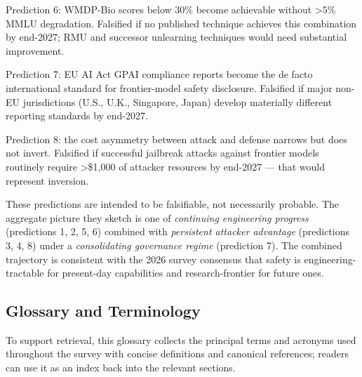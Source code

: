 Prediction 6: WMDP-Bio scores below 30\% become achievable without \textgreater5\% MMLU degradation. Falsified if no published technique achieves this combination by end-2027; RMU and successor unlearning techniques would need substantial improvement.

Prediction 7: EU AI Act GPAI compliance reports become the de facto international standard for frontier-model safety disclosure. Falsified if major non-EU jurisdictions (U.S., U.K., Singapore, Japan) develop materially different reporting standards by end-2027.

Prediction 8: the cost asymmetry between attack and defense narrows but does not invert. Falsified if successful jailbreak attacks against frontier models routinely require \textgreater\$1,000 of attacker resources by end-2027 --- that would represent inversion.

These predictions are intended to be falsifiable, not necessarily probable. The aggregate picture they sketch is one of \emph{continuing engineering progress} (predictions 1, 2, 5, 6) combined with \emph{persistent attacker advantage} (predictions 3, 4, 8) under a \emph{consolidating governance regime} (prediction 7). The combined trajectory is consistent with the 2026 survey consensus that safety is engineering-tractable for present-day capabilities and research-frontier for future ones.

\subsection{Glossary and Terminology}\label{glossary-and-terminology}

To support retrieval, this glossary collects the principal terms and acronyms used throughout the survey with concise definitions and canonical references; readers can use it as an index back into the relevant sections.

